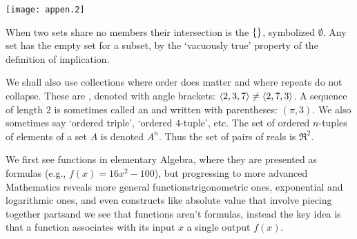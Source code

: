 \begin{center}
  \texttt{[image: appen.2]}
%
%
%
\end{center}

When two sets share no members their intersection
is the  \( \mbox{$\{\}$} \),
symbolized \( \emptyset \).
Any set has the empty set for a subset, by the `vacuously true'
property of the definition of implication.



We shall also use collections where order does matter and where repeats do
not collapse.
These are , denoted with angle brackets:
\( \langle 2,3,7\rangle\neq\langle2,7,3\rangle \).
A sequence of length \( 2 \) is sometimes called an 
and written with parentheses: \( (\pi,3) \).
We also sometimes say `ordered triple', `ordered \( 4 \)-tuple', etc.
The set of ordered \( n \)-tuples of elements of a set \( A \) is denoted
\( A^n \).
Thus the set of pairs of reals is \( \Re^2 \).




We first see functions in elementary Algebra, where they are
presented as formulas (e.g., \( f(x)=16x^2-100 \)), but
progressing to more advanced Mathematics reveals more general
functions\Dash trigonometric ones,
exponential and
logarithmic ones, and even constructs like absolute value that involve
piecing together parts\Dash and we see that functions aren't
formulas, instead the key idea is that a function associates with its
input \( x \) a single output \( f(x) \).

